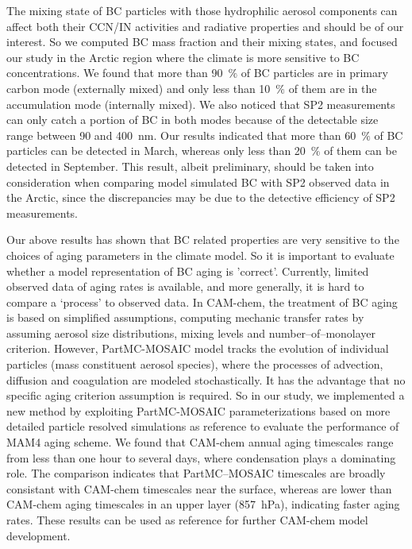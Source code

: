 \documentclass[12pt, fullpage]{uiucthesis2009}
\begin{document}
		The mixing state of BC particles with those hydrophilic aerosol components can affect both their CCN/IN activities and radiative properties and should be of our interest. So we computed BC mass fraction and their mixing states, and focused our study in the Arctic region where the climate is more sensitive to BC concentrations. We found that more than 90~$\%$ of BC particles are in primary carbon mode (externally mixed) and only less than 10~$\%$ of them are in the accumulation mode (internally mixed). We also noticed that SP2 measurements can only catch a portion of BC in both modes because of the detectable size range between 90 and 400~nm. Our results indicated that more than 60~$\%$ of BC particles can be detected in March, whereas only less than 20~$\%$ of them can be detected in September. This result, albeit preliminary, should be taken into consideration when comparing model simulated BC with SP2 observed data in the Arctic, since the discrepancies may be due to the detective efficiency of SP2 measurements. 
 
		Our above results has shown that BC related properties are very sensitive to the choices of aging parameters in the climate model. So it is important to evaluate whether a model representation of BC aging is 'correct'. Currently, limited observed data of aging rates is available, and more generally, it is hard to compare a ‘process’ to observed data. In CAM-chem, the treatment of BC aging is based on simplified assumptions, computing mechanic transfer rates by assuming aerosol size distributions, mixing levels and number--of--monolayer criterion. However, PartMC-MOSAIC model tracks the evolution of individual particles (mass constituent aerosol species), where the processes of advection, diffusion and coagulation are modeled stochastically. It has the advantage that no specific aging criterion assumption is required. So in our study, we implemented a new method by exploiting PartMC-MOSAIC parameterizations based on more detailed particle resolved simulations as reference to evaluate the performance of MAM4 aging scheme. We found that CAM-chem annual aging timescales range from less than one hour to several days, where condensation plays a dominating role. The comparison indicates that PartMC--MOSAIC timescales are broadly consistant with CAM-chem timescales near the surface, whereas are lower than CAM-chem aging timescales in an upper layer (857~hPa), indicating faster aging rates. These results can be used as reference for further CAM-chem model development.
		
\end{document}
